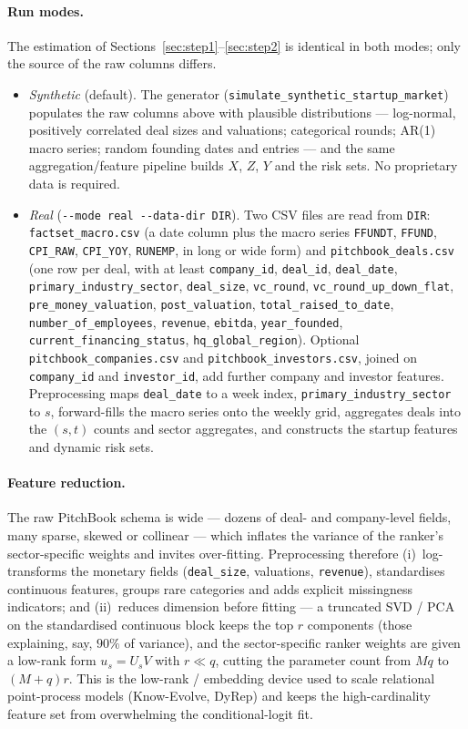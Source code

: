 \documentclass[11pt]{article}
\newcommand{\code}[1]{\texttt{#1}}
\begin{document}
\paragraph{Run modes.} The estimation of Sections~\ref{sec:step1}--\ref{sec:step2} is
identical in both modes; only the source of the raw columns differs.
\begin{itemize}[leftmargin=1.4em,itemsep=2pt]
\item \emph{Synthetic} (default). The generator
(\code{simulate\_synthetic\_startup\_market}) populates the raw columns above with
plausible distributions --- log-normal, positively correlated deal sizes and valuations;
categorical rounds; AR(1) macro series; random founding dates and entries --- and the
same aggregation/feature pipeline builds $X$, $Z$, $Y$ and the risk sets. No proprietary
data is required.
\item \emph{Real} (\code{-{}-mode real -{}-data-dir DIR}). Two CSV files are read from
\code{DIR}: \code{factset\_macro.csv} (a date column plus the macro series
\code{FFUNDT}, \code{FFUND}, \code{CPI\_RAW}, \code{CPI\_YOY}, \code{RUNEMP}, in long or
wide form) and \code{pitchbook\_deals.csv} (one row per deal, with at least
\code{company\_id}, \code{deal\_id}, \code{deal\_date}, \code{primary\_industry\_sector},
\code{deal\_size}, \code{vc\_round}, \code{vc\_round\_up\_down\_flat},
\code{pre\_money\_valuation}, \code{post\_valuation}, \code{total\_raised\_to\_date},
\code{number\_of\_employees}, \code{revenue}, \code{ebitda}, \code{year\_founded},
\code{current\_financing\_status}, \code{hq\_global\_region}). Optional
\code{pitchbook\_companies.csv} and \code{pitchbook\_investors.csv}, joined on
\code{company\_id} and \code{investor\_id}, add further company and investor features.
Preprocessing maps \code{deal\_date} to a week index, \code{primary\_industry\_sector}
to $s$, forward-fills the macro series onto the weekly grid, aggregates deals into the
$(s,t)$ counts and sector aggregates, and constructs the startup features and dynamic
risk sets.
\end{itemize}

\paragraph{Feature reduction.} The raw PitchBook schema is wide --- dozens of deal- and
company-level fields, many sparse, skewed or collinear --- which inflates the variance of
the ranker's sector-specific weights and invites over-fitting. Preprocessing therefore
(i)~log-transforms the monetary fields (\code{deal\_size}, valuations, \code{revenue}),
standardises continuous features, groups rare categories and adds explicit missingness
indicators; and (ii)~reduces dimension before fitting --- a truncated SVD / PCA on the
standardised continuous block keeps the top $r$ components (those explaining, say, $90\%$
of variance), and the sector-specific ranker weights are given a low-rank form
$u_s = U_s V$ with $r\ll q$, cutting the parameter count from $Mq$ to $(M+q)r$. This is
the low-rank / embedding device used to scale relational point-process models
(Know-Evolve, DyRep) and keeps the high-cardinality feature set from overwhelming the
conditional-logit fit.
\end{document}
